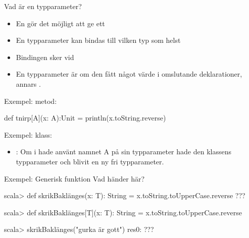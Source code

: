 
\ifkompendium\else


\begin{Slide}{Vad är en typparameter?}\SlideFontSmall
\begin{itemize}
\item En  gör det möjligt att ge ett 
\item En  typparameter kan bindas till vilken typ som helst 
\item Bindingen sker vid 
\item En typparameter är  om den  fått något värde i omslutande deklarationer, annars .
\end{itemize}
Exempel:  metod:
\begin{Code}
def tnirp[A](x: A):Unit = println(x.toString.reverse)
\end{Code}
\pause
Exempel:  klass:
\pause
\begin{itemize}
\item {}: Om  i  hade använt namnet A på sin typparameter hade den  klassens typparameter och blivit en ny fri typparameter.
\end{itemize}

\end{Slide}

\begin{Slide}{Exempel: Generisk funktion}
Vad händer här?
\begin{REPL}

scala> def skrikBaklänges(x: T): String = x.toString.toUpperCase.reverse
???



scala> def skrikBaklänges[T](x: T): String = x.toString.toUpperCase.reverse

scala> skrikBaklänges("gurka är gott")
res0: ???

\end{REPL}
\end{Slide}


